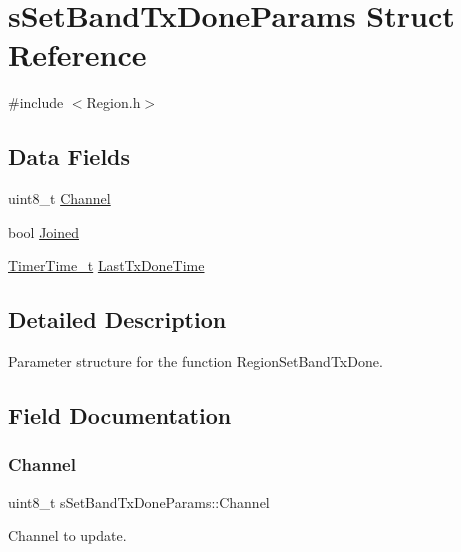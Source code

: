 \hypertarget{structsSetBandTxDoneParams}{}\section{s\+Set\+Band\+Tx\+Done\+Params Struct Reference}
\label{structsSetBandTxDoneParams}


{\ttfamily \#include $<$Region.\+h$>$}

\subsection*{Data Fields}
\begin{DoxyCompactItemize}
\item 
uint8\+\_\+t \hyperlink{structsSetBandTxDoneParams_aa62ca588b3e9ffbca81862caf859d509}{Channel}
\item 
bool \hyperlink{structsSetBandTxDoneParams_aee086764bc76bcd8fe82b8493854702a}{Joined}
\item 
\hyperlink{utilities_8h_a4215ca43d3e953099ea758ce428599d0}{Timer\+Time\+\_\+t} \hyperlink{structsSetBandTxDoneParams_aa1a7b87e8778b47583ec8bfe02aabef4}{Last\+Tx\+Done\+Time}
\end{DoxyCompactItemize}


\subsection{Detailed Description}
Parameter structure for the function Region\+Set\+Band\+Tx\+Done. 

\subsection{Field Documentation}
\mbox{\label{structsSetBandTxDoneParams_aa62ca588b3e9ffbca81862caf859d509}} 
\subsubsection{\texorpdfstring{Channel}{Channel}}
{\footnotesize\ttfamily uint8\+\_\+t s\+Set\+Band\+Tx\+Done\+Params\+::\+Channel}

Channel to update. \mbox{\label{structsSetBandTxDoneParams_aee086764bc76bcd8fe82b8493854702a}} 
